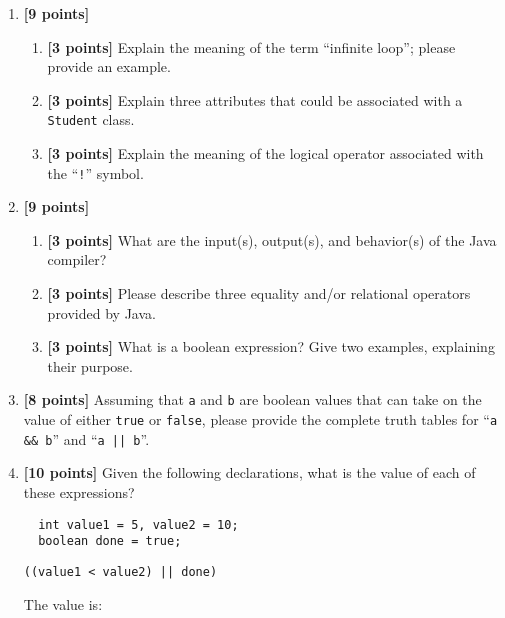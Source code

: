 \begin{enumerate}
\item {\bf [9 points]}
\begin{enumerate}
\item {\bf [3 points]} 
Explain the meaning of the term ``infinite loop''; please provide an example.
\bigskip
\bigskip
\bigskip
\item {\bf [3 points]} 
Explain three attributes that could be associated with a {\tt Student} class.
\bigskip
\bigskip
\bigskip
\bigskip
\item {\bf [3 points]} 
  Explain the meaning of the logical operator associated with the ``{\tt !}'' symbol.
\bigskip
\bigskip
\bigskip
\bigskip
\end{enumerate}
\item {\bf [9 points]}
\begin{enumerate}
\item {\bf [3 points]} 
  What are the input(s), output(s), and behavior(s) of the Java compiler?
\bigskip
\bigskip
\bigskip
\bigskip
\item {\bf [3 points]} 
Please describe three equality and/or relational operators provided by Java.
\bigskip
\bigskip
\bigskip
\bigskip
\item {\bf [3 points]} 
What is a boolean expression? Give two examples, explaining their purpose.
\end{enumerate}
\bigskip
\bigskip
\bigskip
\bigskip

\item {\bf [8 points]}
  Assuming that {\tt a} and {\tt b} are boolean values that can take on the value of either {\tt true} or {\tt false},
  please provide the complete truth tables for ``{\tt a \&\& b}'' and ``{\tt a || b}''.

\vspace{1.2in}

\item {\bf[10 points]} Given the following declarations, what is the value of each of these expressions?

  \begin{verbatim}
  int value1 = 5, value2 = 10;
  boolean done = true;
  \end{verbatim}

  \vspace*{-.35in}
  
\begin{verbatim}
((value1 < value2) || done)
\end{verbatim}

\vspace*{-.175in}
The value is: \mbox{\underline{\hspace{3in}}}


\end{enumerate}
